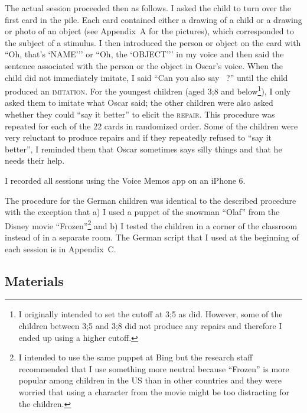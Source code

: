 \documentclass[lucida]{sp} %
\begin{document}
The actual session proceeded then as follows. I asked the child to turn over the first card in the pile. Each card contained either a drawing of a child or a drawing or photo of an object (see Appendix~A for the pictures), which corresponded to the subject of a stimulus. I then introduced the person or object on the card with ``Oh, that's `NAME{'}'' or ``Oh, the `OBJECT{'}'' in my voice and then said the sentence associated with the person or the object in Oscar's voice. When the child did not immediately imitate, I said ``Can you also say \textunderscore\textunderscore\textunderscore\textunderscore\textunderscore \ ?'' until the child produced an \textsc{imitation}. For the youngest children (aged 3;8 and below\footnote{I originally intended to set the cutoff at 3;5 as \cite{clark1989b} did. However, some of the children between 3;5 and 3;8 did not produce any repairs and therefore I ended up using a higher cutoff.}), I only asked them to imitate what Oscar said;  the other children were also asked whether they could ``say it better'' to elicit the \textsc{repair}. This procedure was repeated for each of the 22 cards in randomized order. Some of the children were very reluctant to produce repairs and if they repeatedly refused to ``say it better'', I reminded them that Oscar sometimes says silly things and that he needs their help.

I recorded all sessions using the Voice Memos app on an iPhone 6.

The procedure for the German children was identical to the described procedure with the exception that a) I used a puppet of the snowman ``Olaf'' from the Disney movie ``Frozen''\footnote{I intended to use the same puppet at Bing but the research staff recommended that I use something more neutral because ``Frozen'' is more popular among children in the US than in other countries and they were worried that using a character from the movie might be too distracting for the children.} and b) I tested the children in a corner of the classroom instead of in a separate room. The German script that I used at the beginning of each session is in Appendix~C.

\subsection{Materials}
\end{document}
